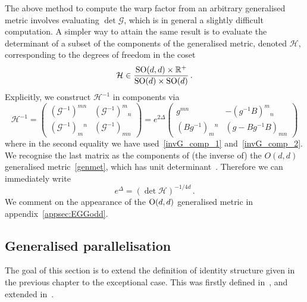 \documentclass[debug]{phd}
\begin{document}
					The above method to compute the warp factor from an arbitrary generalised metric involves evaluating $\det \mathcal{G}$, which is in general a slightly difficult computation. 
					A simpler way to attain the same result is to evaluate the determinant of a subset of the components of the generalised metric, denoted $\mathcal{H}$, corresponding to the degrees of freedom in the coset
							\begin{equation}
								\mathcal{H} \in \frac{\mathrm{SO}(d,d)\times\mathbb{R}^+}{\mathrm{SO}(d)\times\mathrm{SO}(d)}\,.
							\end{equation}
					Explicitly, we construct $\mathcal{H}^{-1}$ in components via
							\begin{equation}\label{eq:GB-metric}
									\mathcal{H}^{-1} = \begin{pmatrix} (\mathcal{G}^{-1})^{mn} & (\mathcal{G}^{-1})^m{}_n \\
		 														(\mathcal{G}^{-1})_m{}^n & (\mathcal{G}^{-1})_{mn} \end{pmatrix}
		 										= e^{2\Delta} \begin{pmatrix} g^{mn} & -(g^{-1} B)^m{}_n \\
		 														(B g^{-1})_m{}^n & (g - B g^{-1} B)_{mn} \end{pmatrix}
							\end{equation}
					where in the second equality we have used~\eqref{invG_comp_1} and~\eqref{invG_comp_2}. 
					We recognise the last matrix as the components of (the inverse of) the $O(d,d)$ generalised metric~\eqref{genmet}, which has unit determinant~\cite{gualtphd}. 
					Therefore we can immediately write
							\begin{equation}
								e^{\Delta} = (\det \mathcal{H})^{-1/4d} \, .
							\end{equation}
					We comment on the appearance of the $\mathrm{O}(d,d)$ generalised metric in appendix~\ref{appsec:EGGodd}.
			\subsection{Generalised parallelisation}\label{secGenPar}
					The goal of this section is to extend the definition of identity structure given in the previous chapter to the exceptional case.
					This was firstly defined in~\cite{spheres}, and extended in~\cite{oscar1}.
					
\end{document}
